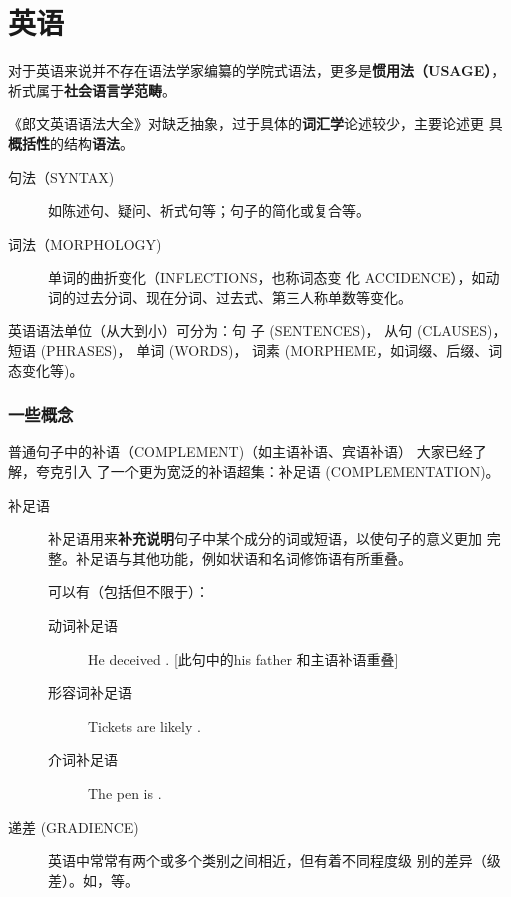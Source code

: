 \chapter{英语}

对于英语来说并不存在语法学家编纂的学院式语法，更多是\textbf{惯用法（USAGE）}，
祈式属于\textbf{社会语言学范畴}。

《郎文英语语法大全》对缺乏抽象，过于具体的\textbf{词汇学}论述较少，主要论述更
具\textbf{概括性}的结构\textbf{语法}。
\begin{description}
\item [句法（SYNTAX)] 如陈述句、疑问、祈式句等；句子的简化或复合等。
\item [词法（MORPHOLOGY)] 单词的曲折变化（INFLECTIONS，也称词态变
  化 ACCIDENCE），如动词的过去分词、现在分词、过去式、第三人称单数等变化。
\end{description}

英语语法单位（从大到小）可分为：句
子 (SENTENCES)， 从句 (CLAUSES)， 短语 (PHRASES)， 单词 (WORDS)， 词素
(MORPHEME，如词缀、后缀、词态变化等)。


\subsection{一些概念}

普通句子中的补语（COMPLEMENT)（如主语补语、宾语补语） 大家已经了解，夸克引入
了一个更为宽泛的补语超集：补足语 (COMPLEMENTATION)。
\begin{description}
\item[补足语] 补足语用来\textbf{补充说明}句子中某个成分的词或短语，以使句子的意义更加
  完整。补足语与其他功能，例如状语和名词修饰语有所重叠。

  可以有（包括但不限于）：
  \begin{description}
  \item[动词补足语] He deceived . [此句中的his father 和主语补语重叠]

  \item[形容词补足语] Tickets are likely .

  \item[介词补足语] The pen is .
  \end{description}
\item[递差 (GRADIENCE)] 英语中常常有两个或多个类别之间相近，但有着不同程度级
  别的差异（级差）。如，等。
\end{description}

